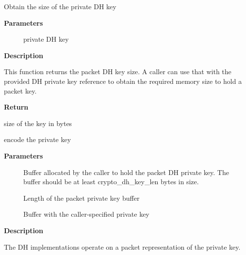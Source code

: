 \documentclass[a4paper,8pt,english]{sphinxmanual}
\begin{document}
\begin{fulllineitems}
\label{crypto/api-kpp:c.crypto_dh_key_len}
Obtain the size of the private DH key

\end{fulllineitems}


\textbf{Parameters}
\begin{description}
\item[{}] \leavevmode
private DH key

\end{description}

\textbf{Description}

This function returns the packet DH key size. A caller can use that
with the provided DH private key reference to obtain the required
memory size to hold a packet key.

\textbf{Return}

size of the key in bytes

\begin{fulllineitems}
\label{crypto/api-kpp:c.crypto_dh_encode_key}
encode the private key

\end{fulllineitems}


\textbf{Parameters}
\begin{description}
\item[{}] \leavevmode
Buffer allocated by the caller to hold the packet DH
private key. The buffer should be at least crypto\_dh\_key\_len
bytes in size.

\item[{}] \leavevmode
Length of the packet private key buffer

\item[{}] \leavevmode
Buffer with the caller-specified private key

\end{description}

\textbf{Description}

The DH implementations operate on a packet representation of the private
key.
\end{document}
